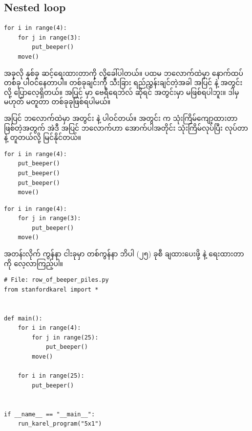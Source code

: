 \subsection*{Nested  loop}
%
\setlength{\fboxsep}{0pt}
\begin{verbatim}
for i in range(4):
    for j in range(3):
        put_beeper()
    move()
\end{verbatim}
%
အခုလို   နှစ်ခု ဆင့်ရေးထားတာကို    လို့ခေါ်ပါတယ်။ ပထမ  ဘလောက်ထဲမှာ နောက်ထပ်   တစ်ခု ပါဝင်နေတာပါ။  တစ်ခုချင်းကို သီးခြား ရည်ညွှန်းချင်တဲ့အခါ အပြင်   နဲ့ အတွင်း   လို့ ပြောလေ့ရှိတယ်။ အပြင်   မှာ ဗေရီရေဘဲလ်  ဆိုရင် အတွင်းမှာ  မဖြစ်ရပါဘူး။ \fEn{,} ဒါမှမဟုတ်  မတူတာ  တစ်ခုခုဖြစ်ရပါမယ်။ 

အပြင်   ဘလောက်ထဲမှာ အတွင်း   နဲ့  ပါဝင်တယ်။ အတွင်း   က   သုံးကြိမ်ကျော့ထားတာ ဖြစ်တဲ့အတွက် အဲဒီ အပြင်   ဘလောက်ဟာ အောက်ပါအတိုင်း  သုံးကြိမ်လုပ်ပြီး  လုပ်တာနဲ့ တူတယ်လို့ မြင်နိုင်တယ်။ 
%
\setlength{\fboxsep}{0pt}
\begin{verbatim}
for i in range(4):
    put_beeper()
    put_beeper()
    put_beeper()
    move()
\end{verbatim}
%
%
\setlength{\fboxsep}{0pt}
\begin{verbatim}
for i in range(4):
    for j in range(3):
        put_beeper()
    move()
\end{verbatim}
%

အတန်းလိုက် ကွန်နာ ငါးခုမှာ တစ်ကွန်နာ ဘိပါ (၂၅) ခုစီ ချထားပေးဖို့   နဲ့ ရေးထားတာကို လေ့လာကြည့်ပါ။
%
\setlength{\fboxsep}{0pt}
\begin{verbatim}
# File: row_of_beeper_piles.py
from stanfordkarel import *


def main():
    for i in range(4):
        for j in range(25):
            put_beeper()
        move()

    for i in range(25):
        put_beeper()


if __name__ == "__main__":
    run_karel_program("5x1")
\end{verbatim}
%

